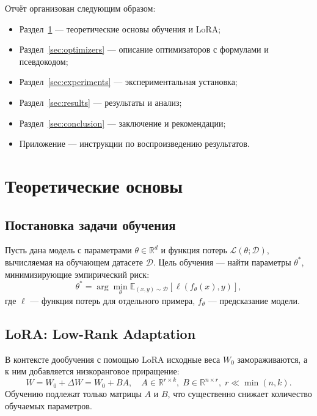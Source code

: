 \documentclass[a4paper,12pt]{article}
\begin{document}
Отчёт организован следующим образом:
\begin{itemize}
    \item Раздел~\ref{sec:theory} --- теоретические основы обучения и LoRA;
    \item Раздел~\ref{sec:optimizers} --- описание оптимизаторов с формулами и псевдокодом;
    \item Раздел~\ref{sec:experiments} --- экспериментальная установка;
    \item Раздел~\ref{sec:results} --- результаты и анализ;
    \item Раздел~\ref{sec:conclusion} --- заключение и рекомендации;
    \item Приложение --- инструкции по воспроизведению результатов.
\end{itemize}
\newpage

\section{Теоретические основы}
\label{sec:theory}

\subsection{Постановка задачи обучения}

Пусть дана модель с параметрами $\theta \in \mathbb{R}^d$ и функция потерь $\mathcal{L}(\theta; \mathcal{D})$, вычисляемая на обучающем датасете $\mathcal{D}$. Цель обучения --- найти параметры $\theta^*$, минимизирующие эмпирический риск:
\begin{equation}
    \theta^* = \arg\min_{\theta} \mathbb{E}_{(x,y) \sim \mathcal{D}}[\ell(f_\theta(x), y)],
\end{equation}
где $\ell$ --- функция потерь для отдельного примера, $f_\theta$ --- предсказание модели.

\subsection{LoRA: Low-Rank Adaptation}

В контексте дообучения с помощью LoRA исходные веса $W_0$ замораживаются, а к ним добавляется низкоранговое приращение:
\begin{equation}
    W = W_0 + \Delta W = W_0 + BA, \quad A \in \mathbb{R}^{r \times k}, \; B \in \mathbb{R}^{n \times r}, \; r \ll \min(n,k).
\end{equation}
Обучению подлежат только матрицы $A$ и $B$, что существенно снижает количество обучаемых параметров.
\end{document}
